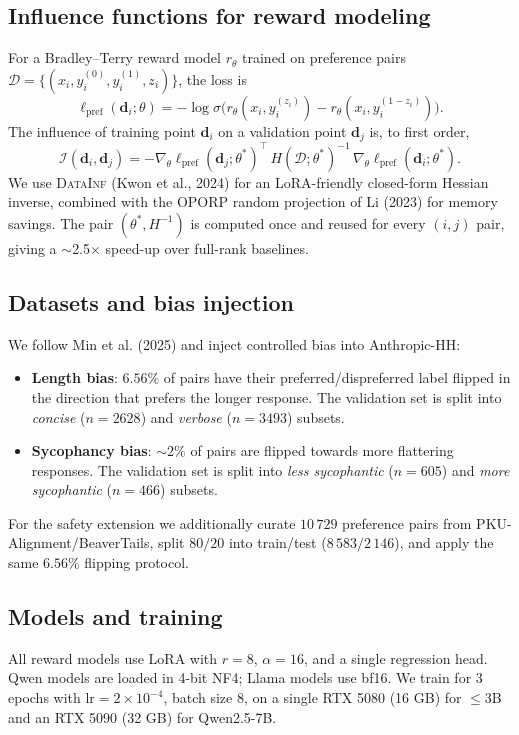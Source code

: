 \documentclass[11pt,a4paper]{article}
\begin{document}
\subsection{Influence functions for reward modeling}
For a Bradley--Terry reward model $r_\theta$ trained on preference pairs $\mathcal D=\{(x_i,
y_i^{(0)}, y_i^{(1)}, z_i)\}$, the loss is
\begin{equation}
\ell_{\text{pref}}(\mathbf d_i;\theta) = -\log\sigma\bigl(r_\theta(x_i,y_i^{(z_i)}) - r_\theta(x_i,y_i^{(1-z_i)})\bigr).
\end{equation}
The influence of training point $\mathbf d_i$ on a validation point $\mathbf d_j$ is, to first order,
\begin{equation}
\mathcal I(\mathbf d_i, \mathbf d_j) = -\nabla_\theta \ell_{\text{pref}}(\mathbf d_j;\theta^*)^{\!\top}\, H(\mathcal D;\theta^*)^{-1}\, \nabla_\theta \ell_{\text{pref}}(\mathbf d_i;\theta^*).
\end{equation}
We use \textsc{DataInf} (Kwon et al., 2024) for an LoRA-friendly closed-form Hessian inverse,
combined with the \textsc{OPORP} random projection of Li (2023) for memory savings.
The pair $(\theta^*, H^{-1})$ is computed once and reused for every $(i,j)$ pair, giving a
$\sim$2.5$\times$ speed-up over full-rank baselines.

\subsection{Datasets and bias injection}
We follow Min et al. (2025) and inject controlled bias into Anthropic-HH:
\begin{itemize}
    \item \textbf{Length bias}: $6.56\%$ of pairs have their preferred/dispreferred label flipped
    in the direction that prefers the longer response. The validation set is split into
    \emph{concise} ($n{=}2628$) and \emph{verbose} ($n{=}3493$) subsets.
    \item \textbf{Sycophancy bias}: $\sim$$2\%$ of pairs are flipped towards more flattering responses.
    The validation set is split into \emph{less sycophantic} ($n{=}605$) and \emph{more sycophantic}
    ($n{=}466$) subsets.
\end{itemize}
For the safety extension we additionally curate $10\,729$ preference pairs from
PKU-Alignment/BeaverTails, split $80/20$ into train/test ($8\,583/2\,146$), and apply the same
$6.56\%$ flipping protocol.

\subsection{Models and training}
All reward models use LoRA with $r{=}8$, $\alpha{=}16$, and a single regression head.
Qwen models are loaded in 4-bit NF4; Llama models use bf16. We train for 3 epochs with
$\text{lr}=2{\times}10^{-4}$, batch size 8, on a single RTX 5080 (16 GB) for $\le$3B and an
RTX 5090 (32 GB) for Qwen2.5-7B.
\end{document}
